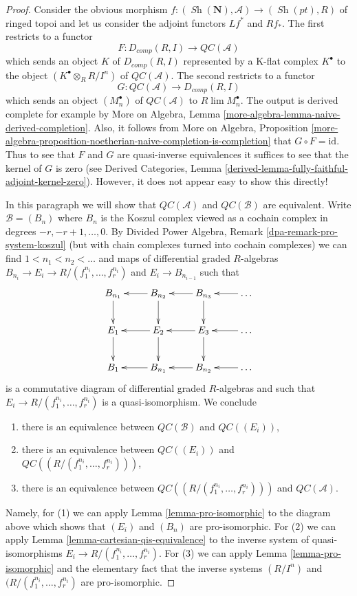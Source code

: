 \documentclass[10pt,a4paper]{amsart}
\theoremstyle{plain}
\theoremstyle{definition}
\theoremstyle{remark}
\numberwithin{equation}{subsection}
\def\lim{\mathop{\mathrm{lim}}\nolimits}
\def\Sh{\mathop{\mathit{Sh}}\nolimits}
\begin{document}
\begin{proof}
Consider the obvious morphism
$f : (\Sh(\mathbf{N}), \mathcal{A}) \to (\Sh(pt), R)$
of ringed topoi
and let us consider the adjoint functors $Lf^*$ and $Rf_*$.
The first restricts to a functor
$$
F : D_{comp}(R, I) \longrightarrow \mathit{QC}(\mathcal{A})
$$
which sends an object $K$ of $D_{comp}(R, I)$ represented by a
K-flat complex $K^\bullet$ to the object $(K^\bullet \otimes_R R/I^n)$
of $\mathit{QC}(\mathcal{A})$. The second restricts to a functor
$$
G : \mathit{QC}(\mathcal{A}) \longrightarrow D_{comp}(R, I)
$$
which sends an object $(M_n^\bullet)$ of $\mathit{QC}(\mathcal{A})$
to $R\lim M_n^\bullet$. The output is derived complete for example
by More on Algebra, Lemma \ref{more-algebra-lemma-naive-derived-completion}.
Also, it follows from More on Algebra, Proposition
\ref{more-algebra-proposition-noetherian-naive-completion-is-completion}
that $G \circ F = \text{id}$. Thus to see that $F$ and $G$
are quasi-inverse equivalences it suffices to see that the kernel
of $G$ is zero (see Derived Categories, Lemma
\ref{derived-lemma-fully-faithful-adjoint-kernel-zero}).
However, it does not appear easy to show this directly!

\medskip\noindent
In this paragraph we will show that $\mathit{QC}(\mathcal{A})$ and
$\mathit{QC}(\mathcal{B})$ are equivalent.
Write $\mathcal{B} = (B_n)$ where $B_n$ is the Koszul complex
viewed as a cochain complex in degrees $-r, -r + 1, \ldots, 0$.
By Divided Power Algebra, Remark \ref{dpa-remark-pro-system-koszul}
(but with chain complexes
turned into cochain complexes)
we can find $1 < n_1 < n_2 < \ldots$
and maps of differential graded $R$-algebras
$B_{n_i} \to E_i \to R/(f_1^{n_i}, \ldots, f_r^{n_i})$
and $E_i \to B_{n_{i - 1}}$ such that
$$
\xymatrix{
B_{n_1} \ar[d] &
B_{n_2} \ar[d] \ar[l] &
B_{n_3} \ar[d] \ar[l] &
\ldots \ar[l] \\
E_1 \ar[d] &
E_2 \ar[l] \ar[d] &
E_3 \ar[l] \ar[d] &
\ldots \ar[l] \\
B_1 &
B_{n_1} \ar[l] &
B_{n_2} \ar[l] &
\ldots \ar[l]
}
$$
is a commutative diagram of differential graded $R$-algebras
and such that $E_i \to R/(f_1^{n_i}, \ldots, f_r^{n_i})$ is
a quasi-isomorphism. We conclude
\begin{enumerate}
\item there is an equivalence between $\mathit{QC}(\mathcal{B})$ and
$\mathit{QC}((E_i))$,
\item there is an equivalence between
$\mathit{QC}((E_i))$ and $\mathit{QC}((R/(f_1^{n_i}, \ldots, f_r^{n_i})))$,
\item there is an equivalence between
$\mathit{QC}((R/(f_1^{n_i}, \ldots, f_r^{n_i})))$ and
$\mathit{QC}(\mathcal{A})$.
\end{enumerate}
Namely, for (1) we can apply Lemma \ref{lemma-pro-isomorphic}
to the diagram above which shows that $(E_i)$ and $(B_n)$ are pro-isomorphic.
For (2) we can apply  Lemma \ref{lemma-cartesian-qis-equivalence} to the
inverse system of quasi-isomorphisms $E_i \to R/(f_1^{n_i}, \ldots, f_r^{n_i})$.
For (3) we can apply Lemma \ref{lemma-pro-isomorphic}
and the elementary fact that the inverse systems $(R/I^n)$ and
$(R/(f_1^{n_i}, \ldots, f_r^{n_i})$ are pro-isomorphic.


\end{proof}
\end{document}
